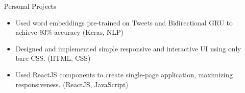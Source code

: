 \documentclass{resume} %
\begin{document}
\begin{workSection}{Personal Projects}
    \customItem[
        title=Tweet topic detection,
        duration=Summer 2023,
        keyHighlight=Built model to detect one of 8 cyber-security topics mentioned in Tweets.
    ]
    \begin{itemize}
        \item Used word embeddings pre-trained on Tweets and Bidirectional GRU to achieve 93\% accuracy (Keras, NLP)
    \end{itemize}
    \customItem[
        title=Personal Portfolio,
        duration=Spring 2023,
        keyHighlight=Built complete portfolio website with ReactJS and bare CSS. See https://ashkan.zone.
    ]
    \begin{itemize}
        \item Designed and implemented simple responsive and interactive UI using only bare CSS. (HTML, CSS)
        \item Used ReactJS components to create single-page application, maximizing responsiveness. (ReactJS, JavaScript)
    \end{itemize}

\end{workSection}
\end{document}
